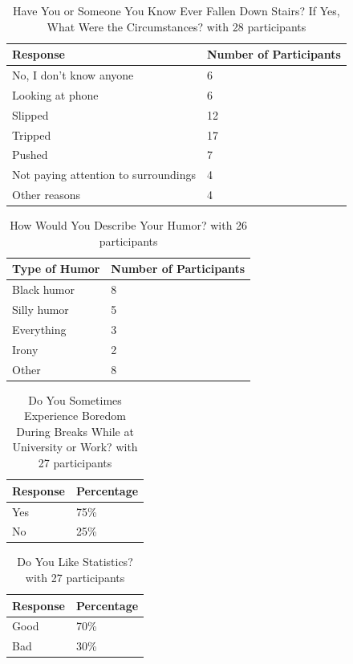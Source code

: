 \documentclass{article}
\begin{document}
\begin{longtable}[]{@{}ll@{}}
\caption{Have You or Someone You Know Ever Fallen Down Stairs? If Yes, What Were the Circumstances? with 28 participants} \label{have-you-or-someone-you-know-ever-fallen-down-stairs-if-yes-what-were-the-circumstances} \\
\toprule\noalign{}
Response & Number of Participants \\
\midrule\noalign{}
\endhead
\bottomrule\noalign{}
\endlastfoot
No, I don't know anyone & 6 \\
Looking at phone & 6 \\
Slipped & 12 \\
Tripped & 17 \\
Pushed & 7 \\
Not paying attention to surroundings & 4 \\
Other reasons & 4 \\
\end{longtable}

\begin{longtable}[]{@{}ll@{}}
\caption{How Would You Describe Your Humor? with 26 participants} \label{how-would-you-describe-your-humor} \\
\toprule\noalign{}
Type of Humor & Number of Participants \\
\midrule\noalign{}
\endhead
\bottomrule\noalign{}
\endlastfoot
Black humor & 8 \\
Silly humor & 5 \\
Everything & 3 \\
Irony & 2 \\
Other & 8 \\
\end{longtable}

\begin{longtable}[]{@{}ll@{}}
\caption{Do You Sometimes Experience Boredom During Breaks While at University or Work? with 27 participants} \label{do-you-sometimes-experience-boredom-during-breaks-while-at-university-or-work} \\
\toprule\noalign{}
Response & Percentage \\
\midrule\noalign{}
\endhead
\bottomrule\noalign{}
\endlastfoot
Yes & 75\% \\
No & 25\% \\
\end{longtable}

\begin{longtable}[]{@{}ll@{}}
\caption{Do You Like Statistics? with 27 participants} \label{do-you-like-statistics} \\
\toprule\noalign{}
Response & Percentage \\
\midrule\noalign{}
\endhead
\bottomrule\noalign{}
\endlastfoot
Good & 70\% \\
Bad & 30\% \\
\end{longtable}
\end{document}

